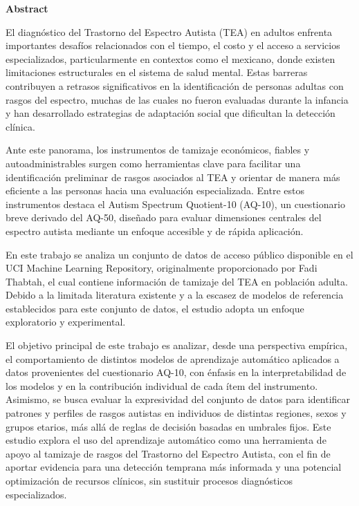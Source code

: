 \begin{center}
	\large
	{\bf Abstract}
\end{center}

El diagnóstico del Trastorno del Espectro Autista (TEA) en adultos enfrenta importantes desafíos relacionados con el tiempo, el costo y el acceso a servicios especializados, particularmente en contextos como el mexicano, donde existen limitaciones estructurales en el sistema de salud mental. Estas barreras contribuyen a retrasos significativos en la identificación de personas adultas con rasgos del espectro, muchas de las cuales no fueron evaluadas durante la infancia y han desarrollado estrategias de adaptación social que dificultan la detección clínica.

Ante este panorama, los instrumentos de tamizaje económicos, fiables y autoadministrables surgen como herramientas clave para facilitar una identificación preliminar de rasgos asociados al TEA y orientar de manera más eficiente a las personas hacia una evaluación especializada. Entre estos instrumentos destaca el Autism Spectrum Quotient-10 (AQ-10), un cuestionario breve derivado del AQ-50, diseñado para evaluar dimensiones centrales del espectro autista mediante un enfoque accesible y de rápida aplicación.

En este trabajo se analiza un conjunto de datos de acceso público disponible en el UCI Machine Learning Repository, originalmente proporcionado por Fadi Thabtah, el cual contiene información de tamizaje del TEA en población adulta. Debido a la limitada literatura existente y a la escasez de modelos de referencia establecidos para este conjunto de datos, el estudio adopta un enfoque exploratorio y experimental.

El objetivo principal de este trabajo es analizar, desde una perspectiva empírica, el comportamiento de distintos modelos de aprendizaje automático aplicados a datos provenientes del cuestionario AQ-10, con énfasis en la interpretabilidad de los modelos y en la contribución individual de cada ítem del instrumento. Asimismo, se busca evaluar la expresividad del conjunto de datos para identificar patrones y perfiles de rasgos autistas en individuos de distintas regiones, sexos y grupos etarios, más allá de reglas de decisión basadas en umbrales fijos. Este estudio explora el uso del aprendizaje automático como una herramienta de apoyo al tamizaje de rasgos del Trastorno del Espectro Autista, con el fin de aportar evidencia para una detección temprana más informada y una potencial optimización de recursos clínicos, sin sustituir procesos diagnósticos especializados.



\vspace{50mm}

\newpage
\phantom{~}
\newpage